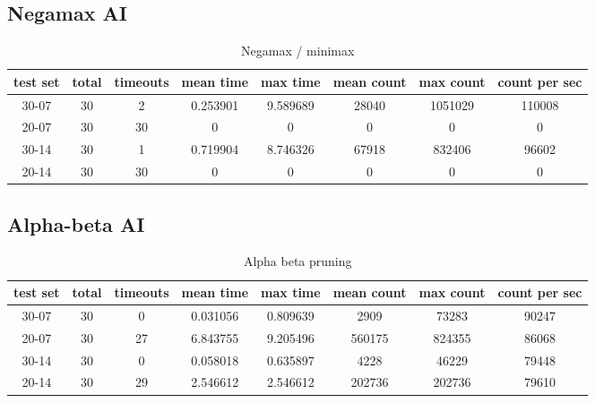 \documentclass[a4paper]{article}
\begin{document}
\subsection{Negamax AI}

\begin{table}[h]
	\centering
	\begin{adjustbox}{center}
	\begin{tabular}{|c|c|c|c|c|c|c|c|}\hline
	\textbf{test set} & \textbf{total} & \textbf{timeouts} & \textbf{mean time} & \textbf{max time} & \textbf{mean count} & \textbf{max count} & \textbf{count per sec} \\\hline
	30-07 & 30 & 2 & 0.253901 & 9.589689 & 28040 & 1051029 & 110008 \\\hline
	20-07 & 30 & 30 & 0 & 0 & 0 & 0 & 0 \\\hline
	30-14 & 30 & 1 & 0.719904 & 8.746326 & 67918 & 832406 & 96602 \\\hline
	20-14 & 30 & 30 & 0 & 0 & 0 & 0 & 0 \\\hline
	\end{tabular}
	\end{adjustbox}
	\caption{Negamax / minimax}
	\label{tab: }
\end{table}

\subsection{Alpha-beta AI}

\begin{table}[h]
	\centering
	\begin{adjustbox}{center}
	\begin{tabular}{|c|c|c|c|c|c|c|c|}\hline
	\textbf{test set} & \textbf{total} & \textbf{timeouts} & \textbf{mean time} & \textbf{max time} & \textbf{mean count} & \textbf{max count} & \textbf{count per sec} \\\hline
	30-07 & 30 & 0 & 0.031056 & 0.809639 & 2909 & 73283 & 90247 \\\hline
	20-07 & 30 & 27 & 6.843755 & 9.205496 & 560175 & 824355 & 86068 \\\hline
	30-14 & 30 & 0 & 0.058018 & 0.635897 & 4228 & 46229 & 79448 \\\hline
	20-14 & 30 & 29 & 2.546612 & 2.546612 & 202736 & 202736 & 79610 \\\hline
	\end{tabular}
	\end{adjustbox}
	\caption{Alpha beta pruning}
	\label{tab: }
\end{table}
\end{document}
